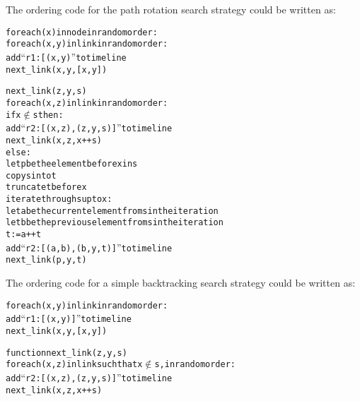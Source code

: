 The ordering code for the path rotation search strategy could be written as:

\begin{alltt}
for each (x) in node in random order:
   for each (x,y) in link in random order:
      add ``r1:[(x,y)'' to timeline
      next_link(x,y,[x,y])

next_link(z,y,s)
   for each (x,z) in link in random order:
      if x \(\not\in\) s then:
         add ``r2: [(x,z), (z,y,s)]'' to timeline
         next_link(x,z,x++s)
      else:
         let p be the element before x in s
         copy s into t
         truncate t before x
         iterate through s up to x:
            let a be the current element from s in the iteration
            let b be the previous element from s in the iteration
            t := a ++ t
            add ``r2: [(a,b), (b,y,t)]'' to timeline
         next_link(p,y,t)
\end{alltt}

The ordering code for a simple backtracking search strategy could be written as:

\begin{alltt}
for each (x,y) in link in random order:
   add ``r1: [(x,y)]'' to timeline
   next_link(x,y,[x,y])

function next_link(z,y,s)
   for each (x,z) in link such that x \(\not\in\) s, in random order:
      add ``r2: [(x,z), (z,y,s)]'' to timeline
      next_link(x,z,x ++ s)
\end{alltt}
